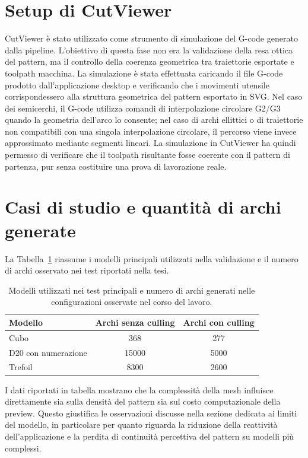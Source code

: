 \documentclass[a4paper,11pt,titlepage,twoside]{book}
\newcommand{\1}{\mathbf{1}}
\numberwithin{equation}{chapter}
\theoremstyle{plain}
\theoremstyle{definition}
\begin{document}
	\section{Setup di CutViewer}
	
	CutViewer è stato utilizzato come strumento di simulazione del G-code generato dalla pipeline. L’obiettivo di questa fase non era la validazione della resa ottica del pattern, ma il controllo della coerenza geometrica tra traiettorie esportate e toolpath macchina. La simulazione è stata effettuata caricando il file G-code prodotto dall’applicazione desktop e verificando che i movimenti utensile corrispondessero alla struttura geometrica del pattern esportato in SVG.
	Nel caso dei semicerchi, il G-code utilizza comandi di interpolazione circolare G2/G3 quando la geometria dell’arco lo consente; nel caso di archi ellittici o di traiettorie non compatibili con una singola interpolazione circolare, il percorso viene invece approssimato mediante segmenti lineari. La simulazione in CutViewer ha quindi permesso di verificare che il toolpath risultante fosse coerente con il pattern di partenza, pur senza costituire una prova di lavorazione reale.
	
	\section{Casi di studio e quantità di archi generate}
	
	La Tabella~\ref{tab:appendix-study-cases} riassume i modelli principali utilizzati nella validazione e il numero di archi osservato nei test riportati nella tesi.
	
	\begin{table}[htbp]
		\centering
		\caption[Casi di studio e numero di archi]{Modelli utilizzati nei test principali e numero di archi generati nelle configurazioni osservate nel corso del lavoro.}
		\label{tab:appendix-study-cases}
		\begin{tabular}{lcc}
			\toprule
			Modello & Archi senza culling & Archi con culling \\
			\midrule
			Cubo & 368 & 277 \\
			D20 con numerazione & 15000 & 5000 \\
			Trefoil & 8300 & 2600 \\
			\bottomrule
		\end{tabular}
	\end{table}
	
	I dati riportati in tabella mostrano che la complessità della mesh influisce direttamente sia sulla densità del pattern sia sul costo computazionale della preview. Questo giustifica le osservazioni discusse nella sezione dedicata ai limiti del modello, in particolare per quanto riguarda la riduzione della reattività dell’applicazione e la perdita di continuità percettiva del pattern su modelli più complessi.
	
\end{document}
